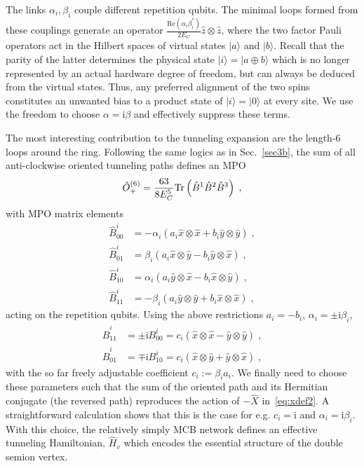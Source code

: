 \documentclass[twocolumn,floats,prx,showpacs]{revtex4-1}
\newcommand{\ket}[1]{|#1\rangle}
\newcommand{\rein}[1]{{\color{rein} #1}}
\begin{document}
The links $\alpha_i, \beta_i$ couple different repetition qubits. The minimal loops formed from these couplings generate an operator $\frac{\text{Re}\left(\alpha_i  \beta_i^\ast\right)}{2 E_C} \hat z \otimes  \hat z$, where the two factor Pauli operators act in the Hilbert spaces of virtual states $\ket{a}$ and $\ket{b}$. Recall that the parity of the latter determines the physical state $\ket{i}=\ket{a \oplus b}$ which is no longer represented by an actual hardware degree of freedom, but can always be deduced from the virtual states. Thus, any preferred alignment of the two spins constitutes an unwanted \rein{bias to a product state of $\ket{i}=\ket{0}$ at every site.} 
We use the freedom to choose  $\alpha = \mathrm i \beta$ and effectively suppress these terms. 

The most interesting contribution to the tunneling expansion are the  length-6 loops around the ring.  Following the same logics as in Sec.~\ref{sec3b}, the sum of all anti-clockwise oriented tunneling paths defines an MPO 
\begin{equation}
\hat O_+^{(6)}=\frac{63}{8E_C^5} {\rm Tr} \left( \hat B^1  \hat B^2 \hat B^3\right)\;,
\end{equation}
with MPO matrix elements 
\begin{align}
\hat B^i_{00}&=  - \alpha_i ( a_i \hat x \otimes \hat x + b_i  \hat y \otimes \hat y)  \;, \label{eq:B} \\
\hat B^i_{01}&= \beta_i (a_i \hat x \otimes \hat y - b_i \hat y \otimes \hat x)  \;, \nonumber \\
\hat B^i_{10}&=\alpha_i(a_i \hat y \otimes \hat x - b_i \hat x \otimes \hat y)  \;, \nonumber \\
\hat B^i_{11}&=-\beta_i(a_i \hat y \otimes \hat y + b_i \hat x \otimes \hat x) \;,  \nonumber 
\end{align}
acting on the repetition qubits.
Using the above restrictions  $a_i=-b_i$, $\alpha_i = \pm \mathrm i \beta_i$,  
\begin{align}
\hat B^i_{11}&=\pm \mathrm{i}B^i_{00}=  c_i(  \hat x \otimes \hat x -  \hat y \otimes \hat y)  \;, \label{eq:B2} \\
\hat B^i_{01}&=\mp\mathrm{i}B^i_{10}= c_i(\hat x \otimes \hat y + \hat y \otimes \hat x)  \;, \nonumber
\end{align}
with the so far freely adjustable coefficient $c_i:=  \beta_i a_i$. We finally need to choose these parameters such that the sum of the oriented path and its Hermitian conjugate (the reversed path) reproduces the action of $-\hat X$ in~\eqref{eq:xdef2}. A straightforward calculation shows that this is the case for e.g. $c_i =\mathrm{i}$ and $\alpha_i=\mathrm i \beta_i$. With this choice, the relatively simply MCB network defines an effective  tunneling Hamiltonian, $\hat H_v$ which  encodes the essential structure of the double semion vertex.   
\end{document}
